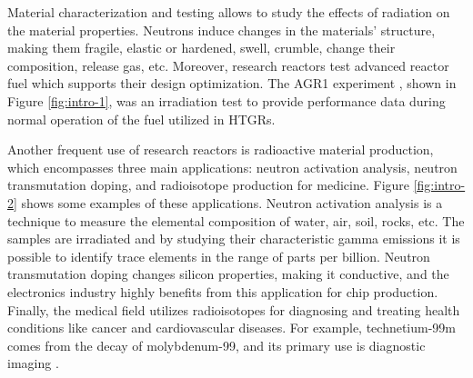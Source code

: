 Material characterization and testing allows to study the effects of radiation on the material properties.
Neutrons induce changes in the materials' structure, making them fragile, elastic or hardened, swell, crumble, change their composition, release gas, etc.
Moreover, research reactors test advanced reactor fuel which supports their design optimization.
The \gls*{AGR1} experiment \cite{sterbentz_agr1_2018}, shown in Figure \ref{fig:intro-1}, was an irradiation test to provide performance data during normal operation of the fuel utilized in \glspl*{HTGR}.

Another frequent use of research reactors is radioactive material production, which encompasses three main applications: neutron activation analysis, neutron transmutation doping, and radioisotope production for medicine.
Figure \ref{fig:intro-2} shows some examples of these applications.
Neutron activation analysis is a technique to measure the elemental composition of water, air, soil, rocks, etc.
The samples are irradiated and by studying their characteristic gamma emissions it is possible to identify trace elements in the range of parts per billion.
Neutron transmutation doping changes silicon properties, making it conductive, and the electronics industry highly benefits from this application for chip production.
Finally, the medical field utilizes radioisotopes for diagnosing and treating health conditions like cancer and cardiovascular diseases.
For example, technetium-99m comes from the decay of molybdenum-99, and its primary use is diagnostic imaging \cite{mattar_exploring_2019}.


